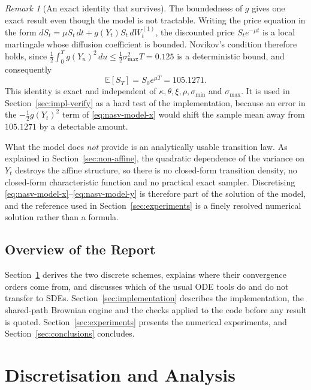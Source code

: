 \documentclass[11pt,a4paper]{article}
\theoremstyle{definition}
\theoremstyle{remark}
\newtheorem{remark}[theorem]{Remark}
\begin{document}
\begin{remark}[An exact identity that survives]
\label{rem:nasv-mean}
The boundedness of $g$ gives one exact result even though the model is not
tractable. Writing the price equation in the form
$dS_t = \mu S_t\, dt + g(Y_t) S_t\, dW_t^{(1)}$, the discounted price
$S_t e^{-\mu t}$ is a local martingale whose diffusion coefficient is bounded.
Novikov's condition therefore holds, since
$\tfrac12 \int_0^T g(Y_u)^2\, du \le \tfrac12 \sigma_{\max}^2 T = 0.125$ is a
deterministic bound, and consequently
\begin{equation}
    \mathbb{E}[S_T] = S_0 e^{\mu T} = 105.1271 .
    \label{eq:nasv-mean}
\end{equation}
This identity is exact and independent of $\kappa, \theta, \xi, \rho,
\sigma_{\min}$ and $\sigma_{\max}$. It is used in
Section~\ref{sec:impl-verify} as a hard test of the implementation, because an
error in the $-\tfrac12 g(Y_t)^2$ term of \eqref{eq:nasv-model-x} would shift
the sample mean away from $105.1271$ by a detectable amount.
\end{remark}

What the model does \emph{not} provide is an analytically usable transition
law. As explained in Section~\ref{sec:non-affine}, the quadratic dependence of
the variance on $Y_t$ destroys the affine structure, so there is no closed-form
transition density, no closed-form characteristic function and no practical
exact sampler. Discretising \eqref{eq:nasv-model-x}--\eqref{eq:nasv-model-y} is
therefore part of the solution of the model, and the reference used in
Section~\ref{sec:experiments} is a finely resolved numerical solution rather
than a formula.

\subsection{Overview of the Report}

Section~\ref{sec:discretisation} derives the two discrete schemes, explains
where their convergence orders come from, and discusses which of the usual ODE
tools do and do not transfer to SDEs. Section~\ref{sec:implementation}
describes the implementation, the shared-path Brownian engine and the checks
applied to the code before any result is quoted.
Section~\ref{sec:experiments} presents the numerical experiments, and
Section~\ref{sec:conclusions} concludes.

\newpage
\section{Discretisation and Analysis}
\label{sec:discretisation}
\end{document}
